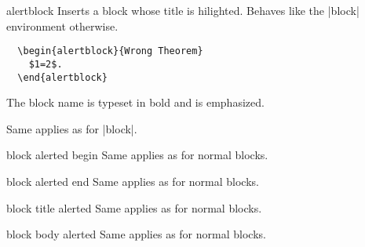 \begin{environment}{{alertblock}} 
  Inserts a block whose title is hilighted. Behaves like the |block|
  environment otherwise.
  \example
\begin{verbatim}
  \begin{alertblock}{Wrong Theorem}
    $1=2$.
  \end{alertblock}
\end{verbatim}

  \articlenote
  The block name is typeset in bold and is emphasized.

  \lyxnote
  Same applies as for |block|.

  \begin{element}{block alerted begin}\yes\no\no
    Same applies as for normal blocks.
  \end{element}

  \begin{element}{block alerted end}\yes\no\no
    Same applies as for normal blocks.
  \end{element}

  \begin{element}{block title alerted}\no\yes\yes
    Same applies as for normal blocks.
  \end{element}

  \begin{element}{block body alerted}\no\yes\yes
    Same applies as for normal blocks.
  \end{element}
\end{environment}

